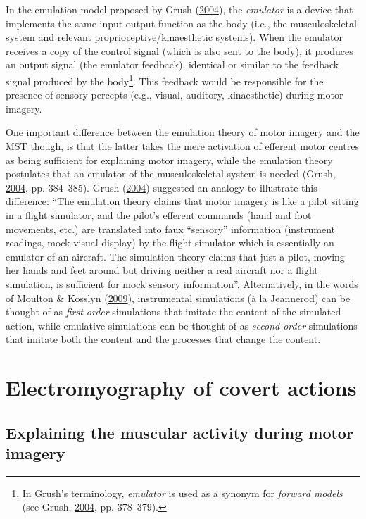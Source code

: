 \documentclass[a4paper,12pt,twoside,openright,oldfontcommands]{memoir}
\let\rmarkdownfootnote\footnote%
\def\footnote{\protect\rmarkdownfootnote}
\begin{document}
In the emulation model proposed by Grush
(\protect\hyperlink{ref-grush_emulation_2004}{2004}), the
\emph{emulator} is a device that implements the same input-output
function as the body (i.e., the musculoskeletal system and relevant
proprioceptive/kinaesthetic systems). When the emulator receives a copy
of the control signal (which is also sent to the body), it produces an
output signal (the emulator feedback), identical or similar to the
feedback signal produced by the body\footnote{In Grush's terminology,
  \emph{emulator} is used as a synonym for \emph{forward models} (see
  Grush, \protect\hyperlink{ref-grush_emulation_2004}{2004}, pp.
  378--379).}. This feedback would be responsible for the presence of
sensory percepts (e.g., visual, auditory, kinaesthetic) during motor
imagery.

One important difference between the emulation theory of motor imagery
and the MST though, is that the latter takes the mere activation of
efferent motor centres as being sufficient for explaining motor imagery,
while the emulation theory postulates that an emulator of the
musculoskeletal system is needed (Grush,
\protect\hyperlink{ref-grush_emulation_2004}{2004}, pp. 384--385). Grush
(\protect\hyperlink{ref-grush_emulation_2004}{2004}) suggested an
analogy to illustrate this difference: ``The emulation theory claims
that motor imagery is like a pilot sitting in a flight simulator, and
the pilot's efferent commands (hand and foot movements, etc.) are
translated into faux ``sensory'' information (instrument readings, mock
visual display) by the flight simulator which is essentially an emulator
of an aircraft. The simulation theory claims that just a pilot, moving
her hands and feet around but driving neither a real aircraft nor a
flight simulation, is sufficient for mock sensory information''.
Alternatively, in the words of Moulton \& Kosslyn
(\protect\hyperlink{ref-moulton_imagining_2009}{2009}), instrumental
simulations (à la Jeannerod) can be thought of as \emph{first-order}
simulations that imitate the content of the simulated action, while
emulative simulations can be thought of as \emph{second-order}
simulations that imitate both the content and the processes that change
the content.

\section{Electromyography of covert actions}\label{emg}

\subsection{Explaining the muscular activity during motor
imagery}\label{explaining-the-muscular-activity-during-motor-imagery}
\end{document}
